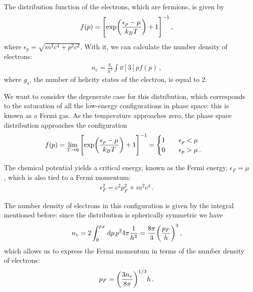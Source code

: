 \documentclass[main.tex]{subfiles}
\begin{document}
The distribution function of the electrons, which are fermions, is given by 
%
\begin{align}
  f(p) = \qty[\exp(\frac{\epsilon _p - \mu }{k_B T})+1]^{-1}
\,,
\end{align}
%
where \(\epsilon _p = \sqrt{m^2 c^{4} + p^2 c^2}\). With it, we can calculate the number density of electrons: 
%
\begin{align}
n_e = \frac{g_s}{h^3} \int \dd[3]{p} f(p)
\,,
\end{align}
%
where \(g_s\), the number of helicity states of the electron, is equal to 2.

We want to consider the degenerate case for this distribution, which corresponds to the saturation of all the low-energy configurations in phase space: this is known as a Fermi gas. 
As the temperature approaches zero, the phase space distribution approaches the configuration 
%
\begin{align}
f(p) = \lim_{T \to 0} \qty[\exp(\frac{\epsilon_p - \mu }{k_B T})+1]^{-1}= 
\begin{cases}
  1 \qquad \epsilon _p < \mu  \\
  0 \qquad \epsilon _p > \mu 
\,.
\end{cases}
\end{align}

The chemical potential yields a critical energy, known as the Fermi energy, \(\epsilon _F = \mu \), which is also tied to a Fermi momentum:
%
%
\begin{align}
  \epsilon_F^2 = c^2p_F^2 + m^2 c^{4}
\,.
\end{align}

The number density of electrons in this configuration is given by the integral mentioned before: since the distribution is spherically symmetric we have
%
\begin{align}
  n_e = 2 \int_{0}^{p_F} \dd{p} p^2 4 \pi \frac{1}{h^3}
  = \frac{8 \pi }{3} \qty(\frac{p_F}{h})^{3}
\,,
\end{align}
%
which allows us to express the Fermi momentum in terms of the number density of electrons:
%
\begin{align}
  p_F = \qty(\frac{3n_e}{8 \pi })^{1/3} h
\,.
\end{align}
\end{document}
